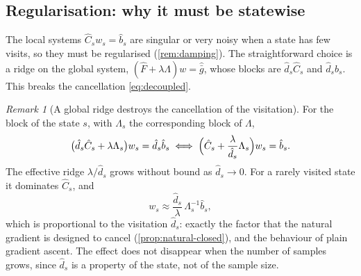\documentclass[11pt,a4paper]{article}
\numberwithin{equation}{section}
\theoremstyle{plain}
\theoremstyle{definition}
\theoremstyle{remark}
\newtheorem{remark}[theorem]{Remark}
\begin{document}
\subsection{Regularisation: why it must be statewise}\label{sec:regularisation}

The local systems $\hat C_s w_s=\hat b_s$ are singular or very noisy when a state has few visits, so they must be regularised (\cref{rem:damping}). The straightforward choice is a ridge on the global system,
$(\hat F+\lambda\Lambda)w=\hat{\bar g}$, whose blocks are $\hat d_s\hat C_s$ and $\hat d_s\hat b_s$. This breaks the cancellation \eqref{eq:decoupled}.

\begin{remark}[A global ridge destroys the cancellation of the visitation]\label{rem:global-ridge}
For the block of the state $s$, with $\Lambda_s$ the corresponding block of $\Lambda$,
\[
  \bigl(\hat d_s\hat C_s+\lambda\Lambda_s\bigr)w_s=\hat d_s\hat b_s
  \iff
  \Bigl(\hat C_s+\frac{\lambda}{\hat d_s}\Lambda_s\Bigr)w_s=\hat b_s .
\]
The effective ridge $\lambda/\hat d_s$ grows without bound as $\hat d_s\to0$. For a rarely visited state it dominates $\hat C_s$, and
\[
  w_s\approx\frac{\hat d_s}{\lambda}\,\Lambda_s^{-1}\hat b_s,
\]
which is proportional to the visitation $\hat d_s$: exactly the factor that the natural gradient is designed to cancel (\cref{prop:natural-closed}), and the behaviour of plain gradient ascent.
The effect does not disappear when the number of samples grows, since $\hat d_s$ is a property of the state, not of the sample size.
\end{remark}
\end{document}
